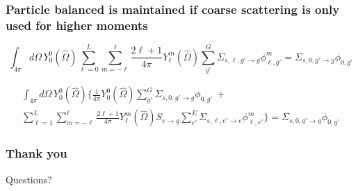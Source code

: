 \documentclass[xcolor=dvipsnames]{beamer}
\begin{document}
\begin{frame}
  \frametitle{Particle balanced is maintained if coarse scattering is only used for higher moments}

\begin{equation*}
\int_{4\pi} d\Omega \, Y_0^0(\hat{\Omega}) \sum_{\ell = 0}^L \sum_{m = -\ell}^{\ell} \frac{2\ell + 1}{4\pi} Y_\ell^m(\hat{\Omega}) \sum_{g'}^G \Sigma_{s,\ell,g' \to g} \phi_{\ell,g'}^m = \Sigma_{s,0,g' \to g} \phi_{0,g'}
\end{equation*}

\begin{multline*}
\int_{4\pi} d\Omega \, Y_0^0(\hat{\Omega}) \Big\{ \frac{1}{4\pi} Y_0^0(\hat{\Omega}) \sum_{g'}^G \Sigma_{s,0,g' \to g} \phi_{0,g'} \: + \\ \sum_{\ell = 1}^L \sum_{m = -\ell}^{\ell} \frac{2\ell + 1}{4\pi} Y_\ell^m(\hat{\Omega}) S_{e \to g} \sum_{e'}^E \Sigma_{s,\ell,e' \to e} \phi_{\ell,e'}^m \Big\} = \Sigma_{s,0,g' \to g} \phi_{0,g'}
\end{multline*}

\end{frame}





\begin{frame}[noframenumbering]
\frametitle{Thank you}
Questions?
\end{frame}
\end{document}
